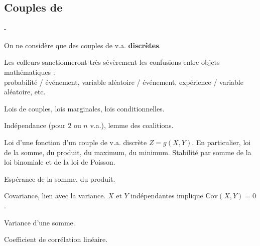 \documentclass[11pt]{article}%
\begin{document}
\subsection*{Couples de \var}

\begin{noliste}{-}
  \item On ne considère que des couples de v.a. {\bf discrètes}.
  \item Les colleurs sanctionneront très sévèrement les confusions entre 
  objets mathématiques :\\ 
  probabilité / événement, variable aléatoire / 
  événement, expérience / variable aléatoire, etc.
  \item Lois de couples, lois marginales, lois conditionnelles.
  \item Indépendance (pour $2$ ou $n$ v.a.), lemme des coalitions.
  \item Loi d'une fonction d'un couple de v.a. discrète $Z=g(X,Y)$. En 
  particulier, loi de la somme, du produit, du maximum, du minimum. 
  Stabilité par somme de la loi binomiale et de la loi de Poisson.
  \item Espérance de la somme, du produit.
  \item Covariance, lien avec la variance. $X$ et $Y$ indépendantes 
  implique $\text{Cov}(X,Y)=0$.
  \item Variance d'une somme.
  \item Coefficient de corrélation linéaire.
\end{noliste}
\end{document}
